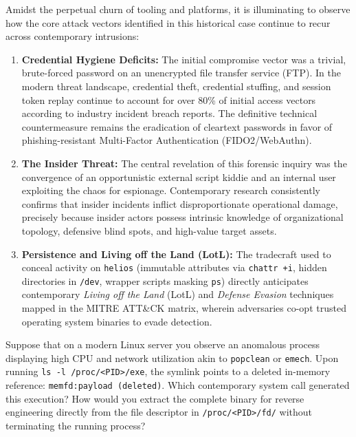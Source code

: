 Amidst the perpetual churn of tooling and platforms, it is illuminating to observe how the core attack vectors identified in this historical case continue to recur across contemporary intrusions:
\begin{enumerate}
    \item \textbf{Credential Hygiene Deficits:} The initial compromise vector was a trivial, brute-forced password on an unencrypted file transfer service (FTP). In the modern threat landscape, credential theft, credential stuffing, and session token replay continue to account for over 80\% of initial access vectors according to industry incident breach reports. The definitive technical countermeasure remains the eradication of cleartext passwords in favor of phishing-resistant Multi-Factor Authentication (FIDO2/WebAuthn).
    \item \textbf{The Insider Threat:} The central revelation of this forensic inquiry was the convergence of an opportunistic external script kiddie and an internal user exploiting the chaos for espionage. Contemporary research consistently confirms that insider incidents inflict disproportionate operational damage, precisely because insider actors possess intrinsic knowledge of organizational topology, defensive blind spots, and high-value target assets.
    \item \textbf{Persistence and Living off the Land (LotL):} The tradecraft used to conceal activity on \texttt{helios} (immutable attributes via \texttt{chattr +i}, hidden directories in \texttt{/dev}, wrapper scripts masking \texttt{ps}) directly anticipates contemporary \textit{Living off the Land} (LotL) and \textit{Defense Evasion} techniques mapped in the MITRE ATT\&CK matrix, wherein adversaries co-opt trusted operating system binaries to evade detection.
\end{enumerate}

\begin{retoforense}
Suppose that on a modern Linux server you observe an anomalous process displaying high CPU and network utilization akin to \texttt{popclean} or \texttt{emech}. Upon running \texttt{ls -l /proc/<PID>/exe}, the symlink points to a deleted in-memory reference: \texttt{memfd:payload (deleted)}.
Which contemporary system call generated this execution? How would you extract the complete binary for reverse engineering directly from the file descriptor in \texttt{/proc/<PID>/fd/} without terminating the running process?
\end{retoforense}

